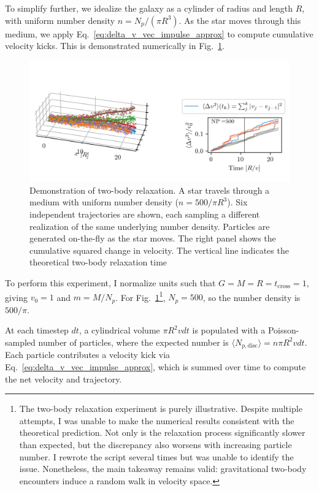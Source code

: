             To simplify further, we idealize the galaxy as a cylinder of radius and length $R$, with uniform number density $n = N_p / (\pi R^3)$. As the star moves through this medium, we apply Eq.~\ref{eq:delta_v_vec_impulse_approx} to compute cumulative velocity kicks. This is demonstrated numerically in Fig.~\ref{fig:twoBodyRelaxation}.
            \begin{figure}
                \includegraphics[]{images/twoBodyRelaxation.png}
                \caption{Demonstration of two-body relaxation. A star travels through a medium with uniform number density ($n = 500/\pi R^3$). Six independent trajectories are shown, each sampling a different realization of the same underlying number density. Particles are generated on-the-fly as the star moves. The right panel shows the cumulative squared change in velocity. The vertical line indicates the theoretical two-body relaxation time}
                \label{fig:twoBodyRelaxation}
            \end{figure}
            To perform this experiment, I normalize units such that $G = M = R = t_\mathrm{cross} = 1$, giving $v_0 = 1$ and $m = M/N_p$. For Fig.~\ref{fig:twoBodyRelaxation}\footnote{The two-body relaxation experiment is purely illustrative. Despite multiple attempts, I was unable to make the numerical results consistent with the theoretical prediction. Not only is the relaxation process significantly slower than expected, but the discrepancy also worsens with increasing particle number. I rewrote the script several times but was unable to identify the issue. Nonetheless, the main takeaway remains valid: gravitational two-body encounters induce a random walk in velocity space.}, $N_p = 500$, so the number density is $500/\pi$. 

            At each timestep $dt$, a cylindrical volume $\pi R^2 v dt$ is populated with a Poisson-sampled number of particles, where the expected number is $\langle N_{p,\mathrm{disc}} \rangle = n \pi R^2 v dt$. Each particle contributes a velocity kick via Eq.~\ref{eq:delta_v_vec_impulse_approx}, which is summed over time to compute the net velocity and trajectory.

